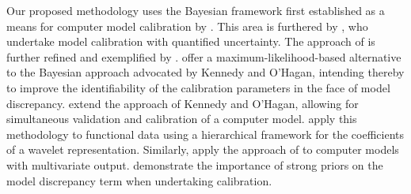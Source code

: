 \documentclass[12pt]{article}
\begin{document}
%
Our proposed methodology uses the Bayesian framework first established as a means for computer model calibration by \cite{Kennedy2001}.
% 
This area is furthered by \cite{Higdon2004}, who undertake model calibration with quantified uncertainty. 
%
%
The approach of \cite{Higdon2004} is further refined and exemplified by \cite{Williams2006}.
%
\cite{Loeppky2006} offer a maximum-likelihood-based alternative to the Bayesian approach advocated by Kennedy and O'Hagan, intending thereby to improve the identifiability of the calibration parameters in the face of model discrepancy. 
%
\cite{Bayarri2007} extend the approach of Kennedy and O'Hagan, allowing for simultaneous validation and calibration of a computer model. %
%
\cite{Bayarri} apply this methodology to functional data using a hierarchical framework for the coefficients of a wavelet representation. 
%
Similarly, \cite{Paulo2012} apply the approach of \cite{Bayarri2007} to computer models with multivariate output.
%
\cite{Brynjarsdottir2014} demonstrate the importance of strong priors on the model discrepancy term when undertaking calibration.
%
\end{document}
